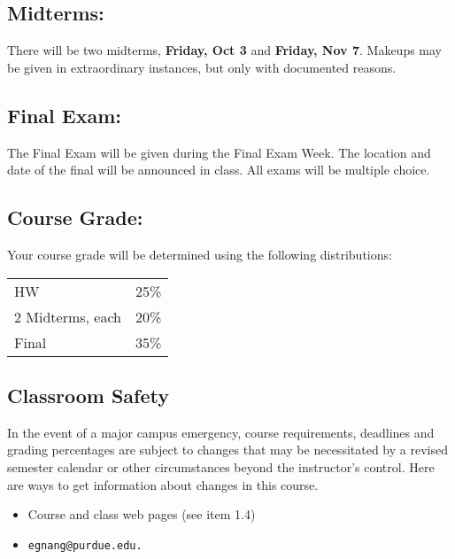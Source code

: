 \documentclass[10pt]{article}
\begin{document}
\subsection{Midterms:}  
	There will be two midterms, {\bf Friday, Oct 3} and {\bf
  Friday, Nov 7}. Makeups may be given in extraordinary
  instances, but only with documented reasons.

\subsection{Final Exam:}
        The Final Exam will be given during the Final Exam Week.
        The location and date of the final will be announced in class.
	All exams will be multiple choice.

\subsection{Course Grade:}
        Your course grade will be determined using the following 
        distributions:

\begin{tabular}{ll}\\
        HW 		 &    25\%\\
        2 Midterms, each     &  20\%\\
        Final           &     35\%\\
\end{tabular}

\subsection{Classroom Safety}
In the event of a major campus emergency, course requirements,
deadlines and grading percentages are subject to changes that may be
necessitated by a revised semester calendar or other circumstances
beyond the instructor's control. Here are ways to get information
about changes in this course.

\begin{itemize}
\item Course and class web pages (see item 1.4)
\item \tt{egnang@purdue.edu}.
\end{itemize}
\end{document}
